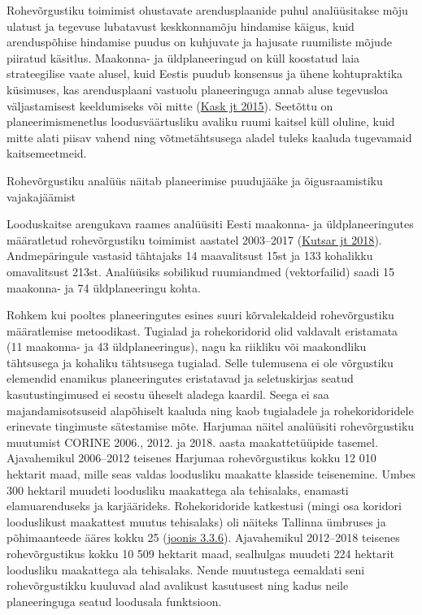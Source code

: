 \documentclass[estonian,]{article}
\begin{document}
Rohevõrgustiku toimimist ohustavate arendusplaanide puhul analüüsitakse mõju ulatust ja tegevuse lubatavust keskkonnamõju hindamise käigus, kuid arenduspõhise hindamise puudus on kuhjuvate ja hajusate ruumiliste mõjude piiratud käsitlus. Maakonna- ja üldplaneeringud on küll koostatud laia strateegilise vaate alusel, kuid Eestis puudub konsensus ja ühene kohtupraktika küsimuses, kas arendusplaani vastuolu planeeringuga annab aluse tegevusloa väljastamisest keeldumiseks või mitte (\protect\hyperlink{Kask2015}{Kask jt 2015}). Seetõttu on planeerimismenetlus loodusväärtusliku avaliku ruumi kaitsel küll oluline, kuid mitte alati piisav vahend ning võtmetähtsusega aladel tuleks kaaluda tugevamaid kaitsemeetmeid.

\begin{casebox}
Rohevõrgustiku analüüs näitab planeerimise puudujääke ja õigusraamistiku
vajakajäämist

Looduskaitse arengukava raames analüüsiti Eesti maakonna- ja
üldplaneeringutes määratletud rohevõrgustiku toimimist aastatel
2003--2017 (\protect\hyperlink{Kutsar2018}{Kutsar jt 2018}).
Andmepäringule vastasid tähtajaks 14 maavalitsust 15st ja 133 kohalikku
omavalitsust 213st. Analüüsiks sobilikud ruumiandmed (vektorfailid)
saadi 15 maakonna- ja 74 üldplaneeringu kohta.

Rohkem kui pooltes planeeringutes esines suuri kõrvalekaldeid
rohevõrgustiku määratlemise metoodikast. Tugialad ja rohekoridorid olid
valdavalt eristamata (11 maakonna- ja 43 üldplaneeringus), nagu ka
riikliku või maakondliku tähtsusega ja kohaliku tähtsusega tugialad.
Selle tulemusena ei ole võrgustiku elemendid enamikus planeeringutes
eristatavad ja seletuskirjas seatud kasutustingimused ei seostu üheselt
aladega kaardil. Seega ei saa majandamisotsuseid alapõhiselt kaaluda
ning kaob tugialadele ja rohekoridoridele erinevate tingimuste
sätestamise mõte. Harjumaa näitel analüüsiti rohevõrgustiku muutumist
CORINE 2006., 2012. ja 2018. aasta maakattetüüpide tasemel. Ajavahemikul
2006--2012 teisenes Harjumaa rohevõrgustikus kokku 12 010 hektarit maad,
mille seas valdas loodusliku maakatte klasside teisenemine. Umbes 300
hektaril muudeti loodusliku maakattega ala tehisalaks, enamasti
elamuarenduseks ja karjäärideks. Rohekoridoride katkestusi (mingi osa
koridori looduslikust maakattest muutus tehisalaks) oli näiteks Tallinna
ümbruses ja põhimaanteede ääres kokku 25
(\protect\hyperlink{figure336}{joonis 3.3.6}). Ajavahemikul 2012--2018
teisenes rohevõrgustikus kokku 10 509 hektarit maad, sealhulgas muudeti
224 hektarit loodusliku maakattega ala tehisalaks. Nende muutustega
eemaldati seni rohevõrgustikku kuuluvad alad avalikust kasutusest ning
kadus neile planeeringuga seatud loodusala funktsioon.


\end{casebox}
\end{document}
